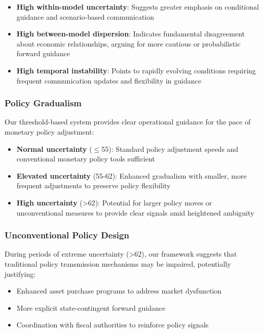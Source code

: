 \documentclass[5p,authoryear]{elsarticle}
\begin{document}
\begin{itemize}
    \item \textbf{High within-model uncertainty}: Suggests greater emphasis on conditional guidance and scenario-based communication
    \item \textbf{High between-model dispersion}: Indicates fundamental disagreement about economic relationships, arguing for more cautious or probabilistic forward guidance
    \item \textbf{High temporal instability}: Points to rapidly evolving conditions requiring frequent communication updates and flexibility in guidance
\end{itemize}

\subsubsection{Policy Gradualism}
Our threshold-based system provides clear operational guidance for the pace of monetary policy adjustment:

\begin{itemize}
    \item \textbf{Normal uncertainty} ($\leq$55): Standard policy adjustment speeds and conventional monetary policy tools sufficient
    \item \textbf{Elevated uncertainty} (55-62): Enhanced gradualism with smaller, more frequent adjustments to preserve policy flexibility
    \item \textbf{High uncertainty} (>62): Potential for larger policy moves or unconventional measures to provide clear signals amid heightened ambiguity
\end{itemize}

\subsubsection{Unconventional Policy Design}
During periods of extreme uncertainty (>62), our framework suggests that traditional policy transmission mechanisms may be impaired, potentially justifying:

\begin{itemize}
    \item Enhanced asset purchase programs to address market dysfunction
    \item More explicit state-contingent forward guidance
    \item Coordination with fiscal authorities to reinforce policy signals
\end{itemize}
\end{document}
